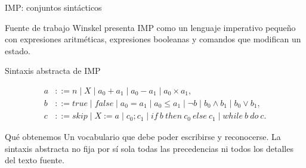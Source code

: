 \documentclass[11pt,spanish]{beamer}
\begin{document}
\begin{frame}{\textsc{IMP}: conjuntos sintácticos}
\vfill

\begin{center}
\end{center}

\bigskip

\begin{block}{Fuente de trabajo}
Winskel presenta \textsc{IMP} como un lenguaje imperativo pequeño con expresiones aritméticas, expresiones booleanas y comandos que modifican un estado.
\end{block}

\vfill
\end{frame}

\begin{frame}{Sintaxis abstracta de \textsc{IMP}}
\vfill

\small
\[
\begin{aligned}
a &::= n \mid X \mid a_0+a_1 \mid a_0-a_1 \mid a_0\times a_1,\\[2pt]
b &::= true \mid false \mid a_0=a_1 \mid a_0\leq a_1
      \mid \neg b \mid b_0\land b_1 \mid b_0\lor b_1,\\[2pt]
c &::= skip \mid X:=a \mid c_0;c_1
      \mid if\ b\ then\ c_0\ else\ c_1
      \mid while\ b\ do\ c.
\end{aligned}
\]

\begin{block}{Qué obtenemos}
Un vocabulario que debe poder escribirse y reconocerse. La sintaxis abstracta no fija por sí sola todas las precedencias ni todos los detalles del texto fuente.
\end{block}

\vfill
\end{frame}
\end{document}
